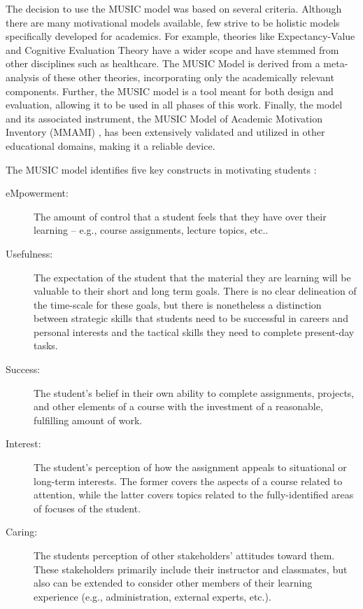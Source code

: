 The decision to use the MUSIC model was based on several criteria.
Although there are many motivational models available, few strive to be holistic models specifically developed for academics.
For example, theories like Expectancy-Value and Cognitive Evaluation Theory have a wider scope and have stemmed from other disciplines such as healthcare.
The MUSIC Model is derived from a meta-analysis of these other theories, incorporating only the academically relevant components.
Further, the MUSIC model is a tool meant for both design and evaluation, allowing it to be used in all phases of this work.
Finally, the model and its associated instrument, the MUSIC Model of Academic Motivation Inventory (MMAMI) , has been extensively validated and utilized in other educational domains, making it a reliable device\cite{jones-validity}.

The MUSIC model identifies five key constructs in motivating students \cite{jones-description}:
\begin{description}
	\item[eMpowerment:] The amount of control that a student feels that they have over their learning -- e.g., course assignments, lecture topics, etc..
	\item[Usefulness:] The expectation of the student that the material they are learning will be valuable to their short and long term goals. There is no clear delineation of the time-scale for these goals, but there is nonetheless a distinction between strategic skills that students need to be successful in careers and personal interests and the tactical skills they need to complete present-day tasks.
	\item[Success:] The student's belief in their own ability to complete assignments, projects, and other elements of a course with the investment of a reasonable, fulfilling amount of work.
	\item[Interest:] The student's perception of how the assignment appeals to situational or long-term interests. The former covers the aspects of a course related to attention, while the latter covers topics related to the fully-identified areas of focuses of the student.
	\item[Caring:] The students perception of other stakeholders' attitudes toward them. These stakeholders primarily include their instructor and classmates, but also can be extended to consider other members of their learning experience (e.g., administration, external experts, etc.).
\end{description}

